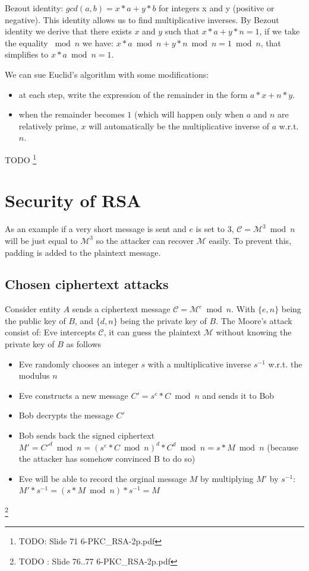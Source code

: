 Bezout identity: $gcd(a,b) = x*a + y*b$ for  integers x and y (positive or negative). This identity allows us to find multiplicative inverses.
By Bezout identity we derive that there exists $x$ and $y$ such that $x*a + y*n = 1$, if we take the equality $\bmod n$ we have: $x*a \bmod n + y*n \bmod n = 1 \bmod n$, that simplifies to $x * a \bmod n = 1$.

We can sue Euclid's algorithm with some modifications:
\begin{itemize}
	\item at each step, write the expression of the remainder in the form $a*x + n*y$.
	\item when the remainder becomes $1$ (which will happen only when $a$ and $n$ are relatively prime, $x$ will automatically be the multiplicative inverse of $a$ w.r.t. $n$.
\end{itemize}

TODO \footnote{TODO: Slide 71 6-PKC\_RSA-2p.pdf}

\section{Security of RSA}

As an example if a very short message is sent and $e$ is set to 3, $\mathcal{C} = \mathcal{M}^3 \bmod n$ will be just equal to $\mathcal{M}^3$ so the attacker can recover $\mathcal{M}$ easily. To prevent this, padding is added to the plaintext message.

\subsection{Chosen ciphertext attacks}

Consider entity $A$ sends a ciphertext message $\mathcal{C} = \mathcal{M}^e \bmod n$. With $\{e,n\}$ being the public key of $B$, and $\{d,n\}$ being the private key of $B$. The Moore's attack consist of: Eve intercepts $\mathcal{C}$, it can guess the plaintext $\mathcal{M}$ without knowing the
private key of $B$ as follows
\begin{itemize}
	\item Eve randomly chooses an integer $s$ with a multiplicative inverse $s^{-1}$ w.r.t. the modulus $n$
	\item Eve constructs a new message $C' = s^e * C \bmod n$ and sends it to Bob
	\item Bob decrypts the message $C'$
	\item Bob sends back the signed ciphertext $M' = C'^{d} \bmod n = (s^e * C \bmod n)^d * C^d \bmod n = s * M \bmod n$ (because the attacker has somehow convinced B to do so)
	\item Eve will be able to record the orginal message $M$ by multiplying $M'$ by $s^{-1}$: $M' * s^{-1} = (s * M \bmod n) * s^{-1} = M$
\end{itemize}
 \footnote{TODO : Slide 76..77 6-PKC\_RSA-2p.pdf}

